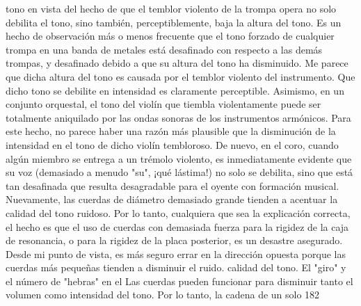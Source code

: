 tono en vista del hecho de que el temblor violento de la trompa opera no solo debilita el tono, sino también, perceptiblemente, baja la altura del tono. Es un hecho de observación más o menos frecuente que el tono forzado de cualquier trompa en una banda de metales está desafinado con respecto a las demás trompas, y desafinado debido a que su altura del tono ha disminuido. Me parece que dicha altura del tono es causada por el temblor violento del instrumento. Que dicho tono se debilite en intensidad es claramente perceptible. Asimismo, en un conjunto orquestal, el tono del violín que tiembla violentamente puede ser totalmente aniquilado por las ondas sonoras de los instrumentos armónicos. Para este hecho, no parece haber una razón más plausible que la disminución de la intensidad en el tono de dicho violín tembloroso. De nuevo, en el coro, cuando algún miembro se entrega a un trémolo violento, es inmediatamente evidente que su voz (demasiado a menudo "su", ¡qué lástima!) no solo se debilita, sino que está tan desafinada que resulta desagradable para el oyente con formación musical. Nuevamente, las cuerdas de diámetro demasiado grande tienden a acentuar la calidad del tono ruidoso. Por lo tanto, cualquiera que sea la explicación correcta, el hecho es que el uso de cuerdas con demasiada fuerza para la rigidez de la caja de resonancia, o para la rigidez de la placa posterior, es un desastre asegurado. Desde mi punto de vista, es más seguro errar en la dirección opuesta porque las cuerdas más pequeñas tienden a disminuir el ruido.
calidad del tono.
El "giro" y el número de "hebras" en el
Las cuerdas pueden funcionar para disminuir tanto el volumen como
intensidad del tono.	Por lo tanto, la cadena de un solo 182

